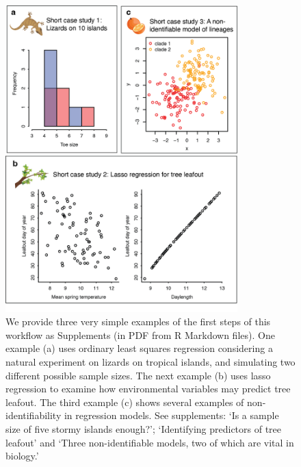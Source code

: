\documentclass[11pt]{article}
\begin{document}
\begin{figure}[ht]
\centering
\noindent \includegraphics[width=0.8\textwidth]{figures/twoexamples.png}
\caption{We provide three very simple examples of the first steps of this workflow as Supplements (in PDF from R Markdown files). One example (a) uses ordinary least squares regression considering a natural experiment on lizards on tropical islands, and simulating two different possible sample sizes. The next example (b) uses lasso regression to examine how environmental variables may predict tree leafout. The third example (c) shows several examples of non-identifiability in regression models. See supplements: `Is a sample size of five stormy islands enough?'; `Identifying predictors of tree leafout' and `Three non-identifiable models, two of which are vital in biology.'}
\label{fig:twoexamples}
\end{figure}
\end{document}
